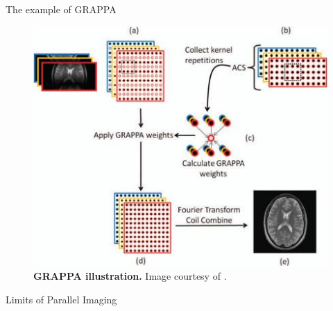 \documentclass[aspectratio=169,xcolor=dvipsnames]{beamer}
\begin{document}
\begin{frame}{The example of GRAPPA}
    \begin{figure}
        \centering
        \includegraphics[height=0.6\textheight]{Figures/intro_figures/GRAPPA.jpeg}
        \caption{\label{fig:GRAPPA}\textbf{GRAPPA illustration.} Image courtesy of \citet{deshmane2012parallel}.
        }
    \end{figure} 
\end{frame}

\begin{frame}{Limits of Parallel Imaging}
\end{frame}
\end{document}
